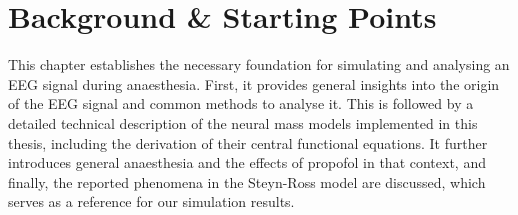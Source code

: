 
\chapter{Background \& Starting Points}\label{ch:theoretical-concepts} %
This chapter establishes the necessary foundation for simulating and analysing an EEG signal during anaesthesia.
First, it provides general insights into the origin of the EEG signal and common methods to analyse it.
This is followed by a detailed technical description of the neural mass models implemented in this thesis,
including the derivation of their central functional equations.
It further introduces general anaesthesia and the effects of propofol in that context,
and finally, the reported phenomena in the Steyn-Ross model are discussed,
which serves as a reference for our simulation results.
%


\pagebreak

\pagebreak

\pagebreak
%
